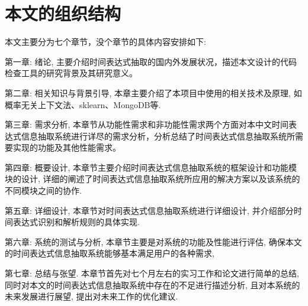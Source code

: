 \section{本文的组织结构}

本文主要分为七个章节，没个章节的具体内容安排如下:

第一章: 绪论, 主要介绍时间表达式抽取的国内外发展状况，描述本文设计的代码检查工具的研究背景及其研究意义。

第二章: 相关知识与背景引导, 本章主要介绍了本项目中使用的相关技术及原理, 如概率无关上下文法、sklearn、MongoDB等.

第三章: 需求分析, 本章节从功能性需求和非功能性需求两个方面对本中文时间表达式信息抽取系统进行详尽的需求分析，分析总结了时间表达式信息抽取系统所需要实现的功能及其他性能需求。

第四章: 概要设计, 本章节主要介绍时间表达式信息抽取系统的框架设计和功能模块的设计, 详细的阐述了时间表达式信息抽取系统所应用的解决方案以及该系统的不同模块之间的协作.

第五章: 详细设计, 本章节对时间表达式信息抽取系统进行详细设计, 并介绍部分时间表达式识别和解析规则的具体实现.

第六章: 系统的测试与分析, 本章节主要是对系统的功能及性能进行评估, 确保本文的时间表达式信息抽取系统能够基本满足用户的各种需求,

第七章: 总结与张望. 本章节首先对七个月左右的实习工作和论文进行简单的总结, 同时对本文的时间表达式信息抽取系统中存在的不足进行描述分析, 且对本系统的未来发展进行展望, 提出对未来工作的优化建议.
